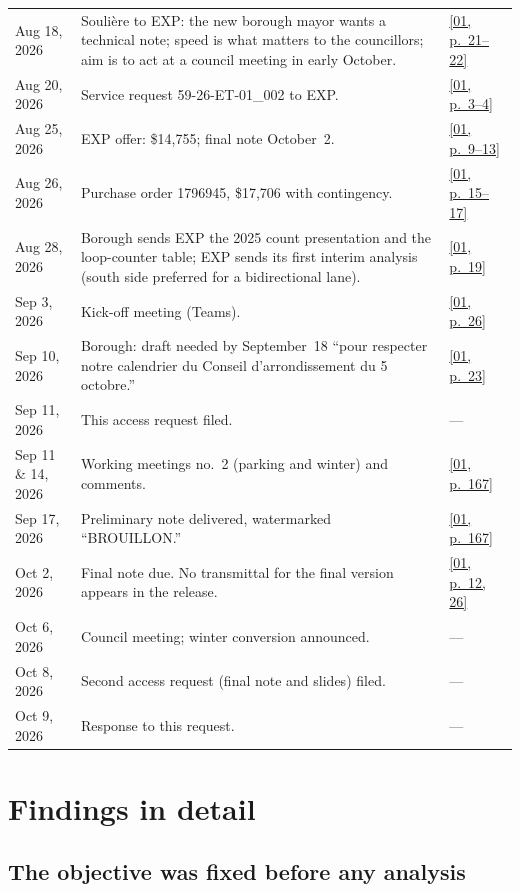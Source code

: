 \documentclass[11pt,letterpaper]{article}
\newcommand{\pagesurl}{https://openmobilitydata.github.io/Terrebonne-access-requests}
\newcommand{\pgl}[3]{\href{\pagesurl/\csname bundle#1\endcsname\#page=#2}{\textsf{\small[#1, p.~#3]}}}
\newcommand{\pg}[2]{\pgl{#1}{#2}{#2}}
\begin{document}
\begin{small}
\begin{longtable}{>{\raggedright\arraybackslash}p{2.6cm}>{\raggedright\arraybackslash}p{10.2cm}>{\raggedright\arraybackslash}p{2.0cm}}
Aug 18, 2026 & Soulière to EXP: the new borough mayor wants a technical note; speed is what matters to the councillors; aim is to act at a council meeting in early October. & \pgl{01}{21}{21--22} \\
Aug 20, 2026 & Service request 59-26-ET-01\_002 to EXP. & \pgl{01}{3}{3--4} \\
Aug 25, 2026 & EXP offer: \$14{,}755; final note October~2. & \pgl{01}{9}{9--13} \\
Aug 26, 2026 & Purchase order 1796945, \$17{,}706 with contingency. & \pgl{01}{15}{15--17} \\
Aug 28, 2026 & Borough sends EXP the 2025 count presentation and the loop-counter table; EXP sends its first interim analysis (south side preferred for a bidirectional lane). & \pg{01}{19} \\
Sep 3, 2026 & Kick-off meeting (Teams). & \pg{01}{26} \\
Sep 10, 2026 & Borough: draft needed by September~18 ``pour respecter notre calendrier du Conseil d'arrondissement du 5 octobre.'' & \pg{01}{23} \\
Sep 11, 2026 & This access request filed. & --- \\
Sep 11 \& 14, 2026 & Working meetings no.~2 (parking and winter) and comments. & \pg{01}{167} \\
Sep 17, 2026 & Preliminary note delivered, watermarked ``BROUILLON.'' & \pg{01}{167} \\
Oct 2, 2026 & Final note due. No transmittal for the final version appears in the release. & \pgl{01}{12}{12, 26} \\
Oct 6, 2026 & Council meeting; winter conversion announced. & --- \\
Oct 8, 2026 & Second access request (final note and slides) filed. & --- \\
Oct 9, 2026 & Response to this request. & --- \\
\bottomrule
\end{longtable}
\end{small}

\section{Findings in detail}

\subsection{The objective was fixed before any analysis}
\end{document}
